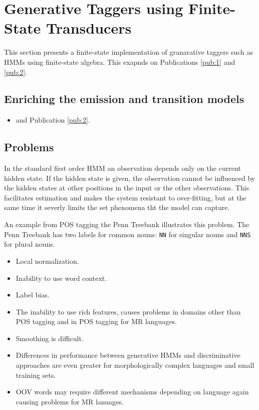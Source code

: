 \chapter{Generative Taggers using Finite-State Transducers}

This section presents a finite-state implementation of granarative taggers such as HMMs using finite-state algebra. This exapnds on Publications \ref{pub:1} and \ref{pub:2}.

\section{Enriching the emission and transition models}
\begin{itemize}
\item \cite{Halacsy2007} and Publication \ref{pub:2}.
\end{itemize}

\section{Problems}
In the standard first order HMM an observation depends only on the
current hidden state. If the hidden state is given, the observation
cannot be influenced by the hidden states at other positions in the
input or the other observations. This facilitates estimation and makes
the system resistant to over-fitting, but at the same time it severly
limits the set phenomena tht the model can capture.

An example from POS tagging the Penn Treebank illustrates this
problem. The Penn Treebank has two labels for common nouns: {\tt NN}
for singular nouns and {\tt NNS} for plural nouns.

\begin{itemize}
\item Local normalization.
\item Inability to use word context.
\item Label bias.
\item The inability to use rich features, causes problems in domains
  other than POS tagging and in POS tagging for MR languages.
\item Smoothing is difficult.
\item Differences in performance between generative HMMs and
  discriminative approaches are even greater for morphologically
  complex languages and small training sets.
\item OOV words may require different mechanisms depending on
  language again causing problems for MR lanuages.
\end{itemize}


